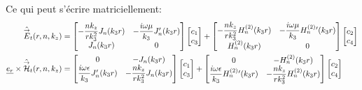     Ce qui peut s'écrire matriciellement:
    \begin{align}
        \hat {{\overset{\rightarrow}{E}}}_t(r,n,k_z) &= 
        \begin{bmatrix}
            -\dfrac{nk_z}{rk_3^2}J_n(k_3r) & -\dfrac{i\omega\mu}{k_3}J_n'(k_3r)
            \\
            J_n(k_3r) & 0
        \end{bmatrix}
        \begin{bmatrix}
            c_1 \\
            c_3
        \end{bmatrix}
        +
        \begin{bmatrix}
            -\dfrac{nk_z}{rk_3^2}H_n^{(2)}(k_3r) & -\dfrac{i\omega\mu}{k_3}H_n^{(2)}{}'(k_3r)
            \\
            H_n^{(2)}(k_3r) & 0
        \end{bmatrix}
        \begin{bmatrix}
            c_2 \\
            c_4
        \end{bmatrix}
        \\
        \underline{e_r}\times\hat {{\overset{\rightarrow}{\mathcal{H}}}}_t(r,n,k_z) &= 
        \begin{bmatrix}
            0 & -J_n(k_3r)
            \\
            \dfrac{i\omega\epsilon}{k_3}J_n'(k_3r) & -\dfrac{nk_z}{rk_3^2}J_n(k_3r)
        \end{bmatrix}
        \begin{bmatrix}
            c_1 \\
            c_3
        \end{bmatrix}
        +
        \begin{bmatrix}
            0 & -H_n^{(2)}(k_3r)
            \\
            \dfrac{i\omega\epsilon}{k_3}H_n^{(2)}{}'(k_3r) & -\dfrac{nk_z}{rk_3^2}H_n^{(2)}(k_3r)
        \end{bmatrix}
        \begin{bmatrix}
            c_2 \\
            c_4
        \end{bmatrix}
    \end{align}

    \newcommand{\mJ}{\mat{J}}
    \newcommand{\mH}{\mat{H}}

